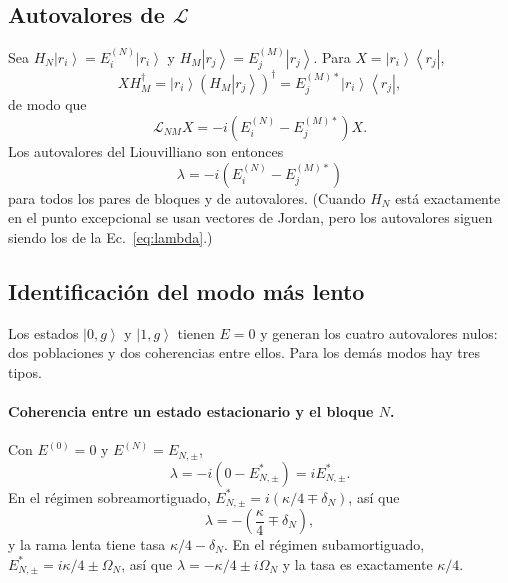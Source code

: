 \documentclass[11pt]{report}
\newcommand{\ket}[1]{\left|#1\right\rangle}
\newcommand{\bra}[1]{\left\langle#1\right|}
\newcommand{\Lv}{\mathcal{L}}
\begin{document}
\subsection{Autovalores de $\Lv$}

Sea $H_{N}\ket{r_{i}}=E^{(N)}_{i}\ket{r_{i}}$ y $H_{M}\ket{r_{j}}=E^{(M)}_{j}\ket{r_{j}}$. Para $X=\ket{r_{i}}\bra{r_{j}}$,
\begin{equation}
XH_{M}^{\dagger} = \ket{r_{i}}\left(H_{M}\ket{r_{j}}\right)^{\dagger} = E^{(M)*}_{j}\ket{r_{i}}\bra{r_{j}},
\end{equation}
de modo que
\begin{equation}
\Lv_{NM}X = -i\left(E^{(N)}_{i}-E^{(M)*}_{j}\right)X .
\end{equation}
Los autovalores del Liouvilliano son entonces
\begin{equation}
\boxed{\lambda = -i\left(E^{(N)}_{i}-E^{(M)*}_{j}\right)}
\label{eq:lambda}
\end{equation}
para todos los pares de bloques y de autovalores. (Cuando $H_{N}$ est\'a exactamente en el punto excepcional se usan vectores de Jordan, pero los autovalores siguen siendo los de la Ec.~\eqref{eq:lambda}.)

\subsection{Identificaci\'on del modo m\'as lento}

Los estados $\ket{0,g}$ y $\ket{1,g}$ tienen $E=0$ y generan los cuatro autovalores nulos: dos poblaciones y dos coherencias entre ellos. Para los dem\'as modos hay tres tipos.

\paragraph{Coherencia entre un estado estacionario y el bloque $N$.} Con $E^{(0)}=0$ y $E^{(N)}=E_{N,\pm}$,
\begin{equation}
\lambda = -i\left(0 - E_{N,\pm}^{*}\right) = iE_{N,\pm}^{*} .
\end{equation}
En el r\'egimen sobreamortiguado, $E_{N,\pm}^{*}=i(\kappa/4\mp\delta_{N})$, as\'i que
\begin{equation}
\lambda = -\left(\frac{\kappa}{4}\mp\delta_{N}\right),
\end{equation}
y la rama lenta tiene tasa $\kappa/4-\delta_{N}$. En el r\'egimen subamortiguado, $E_{N,\pm}^{*}=i\kappa/4\pm\Omega_{N}$, as\'i que $\lambda=-\kappa/4\pm i\Omega_{N}$ y la tasa es exactamente $\kappa/4$.
\end{document}
